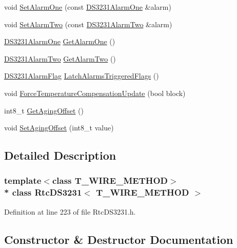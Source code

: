 \begin{DoxyCompactItemize}
\item 
void \hyperlink{class_rtc_d_s3231_ac0c0bb0b87644d46124bb390bbdcd8a6}{Set\+Alarm\+One} (const \hyperlink{class_d_s3231_alarm_one}{D\+S3231\+Alarm\+One} \&alarm)
\item 
void \hyperlink{class_rtc_d_s3231_a4e8bcde1ec694bb4a7403d1af1820709}{Set\+Alarm\+Two} (const \hyperlink{class_d_s3231_alarm_two}{D\+S3231\+Alarm\+Two} \&alarm)
\item 
\hyperlink{class_d_s3231_alarm_one}{D\+S3231\+Alarm\+One} \hyperlink{class_rtc_d_s3231_a1432d525a7c9476016e79011c9c6deac}{Get\+Alarm\+One} ()
\item 
\hyperlink{class_d_s3231_alarm_two}{D\+S3231\+Alarm\+Two} \hyperlink{class_rtc_d_s3231_a990fe562a1c3c54218d0e3f6df2ad038}{Get\+Alarm\+Two} ()
\item 
\hyperlink{_rtc_d_s3231_8h_a14ff88e820f55bcdd9763e4c8a18cfec}{D\+S3231\+Alarm\+Flag} \hyperlink{class_rtc_d_s3231_a7bb14e7c7259122bcbaa7ab87f4a3f41}{Latch\+Alarms\+Triggered\+Flags} ()
\item 
void \hyperlink{class_rtc_d_s3231_ab4c23c09699a670869b988917dfccafb}{Force\+Temperature\+Compensation\+Update} (bool block)
\item 
int8\+\_\+t \hyperlink{class_rtc_d_s3231_a2ee7a2efbfc4a3d3be4fb4fc0617205f}{Get\+Aging\+Offset} ()
\item 
void \hyperlink{class_rtc_d_s3231_aa225e3c0047fb679992eca8026920e43}{Set\+Aging\+Offset} (int8\+\_\+t value)
\end{DoxyCompactItemize}


\subsection{Detailed Description}
\subsubsection*{template$<$class T\+\_\+\+W\+I\+R\+E\+\_\+\+M\+E\+T\+H\+OD$>$\\*
class Rtc\+D\+S3231$<$ T\+\_\+\+W\+I\+R\+E\+\_\+\+M\+E\+T\+H\+O\+D $>$}



Definition at line 223 of file Rtc\+D\+S3231.\+h.



\subsection{Constructor \& Destructor Documentation}
